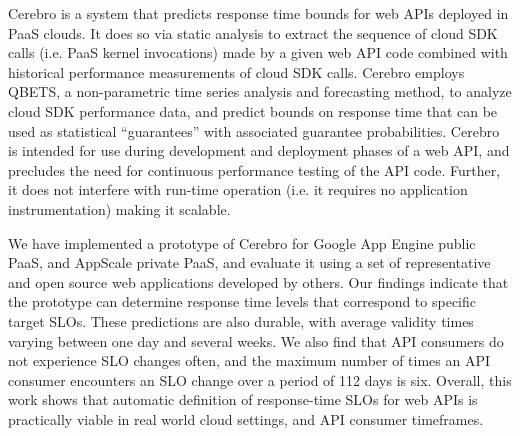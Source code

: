 
Cerebro is a system that predicts response time 
bounds for web APIs deployed in PaaS clouds.  It does so via 
static analysis to extract the sequence of cloud SDK 
calls (i.e. PaaS kernel invocations) made by a given web API code combined with
historical performance measurements of cloud SDK calls. 
Cerebro employs QBETS, a non-parametric time series analysis and 
forecasting method, to analyze
cloud SDK performance data, and predict bounds
on response time that can be used as statistical ``guarantees'' with
associated guarantee probabilities.
Cerebro is intended for use during development and 
deployment phases of a web API, and 
precludes the need for continuous performance testing of the API code. 
Further, it does not interfere with run-time operation (i.e. it requires
no application instrumentation) making it scalable.

We have implemented a prototype of Cerebro for Google App Engine public PaaS,
and AppScale private PaaS,
and evaluate it using a set of representative
and open source web applications developed by others.  
Our findings indicate that the prototype can determine response time levels
that correspond to specific target SLOs.  These predictions are also durable,
with average validity times varying between one day and several weeks.
We also find that API consumers do not experience SLO changes often, and the maximum
number of times an API consumer encounters an SLO change over a period of 112 days is six.
Overall, this work shows that automatic definition of response-time SLOs for web APIs is practically
viable in real world cloud settings, and API consumer timeframes.

